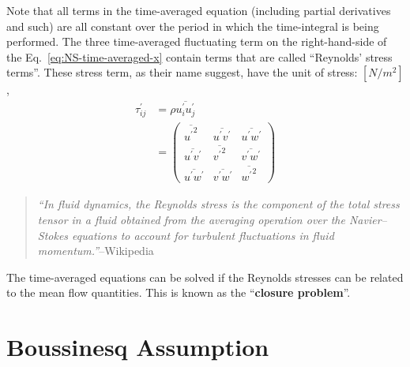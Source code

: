Note that all terms in the time-averaged equation (including partial derivatives and such) are all constant over the period in which the time-integral is being performed.
%
The three time-averaged fluctuating term on the right-hand-side of the Eq.~\ref{eq:NS-time-averaged-x} contain terms that are called ``Reynolds' stress terms''. These stress term, as their name suggest, have the unit of stress: \([N/m^2]\),
%
\begin{equation}
  \begin{aligned}
    \tau^\prime_{ij}
    &= \rho \overline{u^\prime_i u^\prime_j} \\[5pt]
    &= \begin{pmatrix}
      \overline{{{u^\prime}}^2}
    & \overline{{u^\prime}{v^\prime}}
    & \overline{{u^\prime}{w^\prime}} \\
      \overline{{u^\prime}{v^\prime}}
    & \overline{{{v^\prime}}^2}
    & \overline{{v^\prime}{w^\prime}} \\
      \overline{{u^\prime}{w^\prime}}
    & \overline{{v^\prime}{w^\prime}}
    & \overline{{{w^\prime}}^2}
    \end{pmatrix}
  \end{aligned}
  \label{eq:reynolds-stress-matrix}
\end{equation}
%
\begin{quote}
  \emph{``In fluid dynamics, the Reynolds stress is the component of the total stress tensor in a fluid obtained from the averaging operation over the Navier–Stokes equations to account for turbulent fluctuations in fluid momentum.''}--Wikipedia
\end{quote}
%
The time-averaged equations can be solved if the Reynolds stresses can be related to the mean flow quantities.
This is known as the ``\textbf{closure problem}''.



\section{Boussinesq Assumption}\label{sec:boussinesq-assumption}

